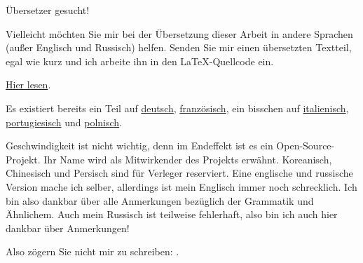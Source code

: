 \vspace*{\fill}

\Huge Übersetzer gesucht!

\normalsize

\bigskip
\bigskip
\bigskip

Vielleicht möchten Sie mir bei der Übersetzung dieser Arbeit in andere Sprachen (außer Englisch und
Russisch) helfen. Senden Sie mir einen übersetzten Textteil, egal wie kurz und ich arbeite ihn in den
\LaTeX{}-Quellcode ein.

\href{https://github.com/DennisYurichev/RE-for-beginners/blob/master/Translation.md}{Hier lesen}.

Es existiert bereits ein Teil auf \href{https://beginners.re/RE4B-DE.pdf}{deutsch},
\href{https://beginners.re/RE4B-FR.pdf}{französisch}, ein bisschen auf
\href{https://yurichev.com/tmp/RE4B-IT-partial.pdf}{italienisch},
\href{https://yurichev.com/tmp/RE4B-PTBR-lite2.pdf}{portugiesisch} und
\href{https://yurichev.com/tmp/RE4B-PL.pdf}{polnisch}.

Geschwindigkeit ist nicht wichtig, denn im Endeffekt ist es ein Open-Source-Projekt.
Ihr Name wird als Mitwirkender des Projekts erwähnt.
Koreanisch, Chinesisch und Persisch sind für Verleger reserviert.
Eine englische und russische Version mache ich selber, allerdings ist mein Englisch immer noch schrecklich.
Ich bin also dankbar über alle Anmerkungen bezüglich der Grammatik und Ähnlichem.
Auch mein Russisch ist teilweise fehlerhaft, also bin ich auch hier dankbar über Anmerkungen!%

Also zögern Sie nicht mir zu schreiben: \GTT{\EMAIL}.

\vspace*{\fill}
\vfill
